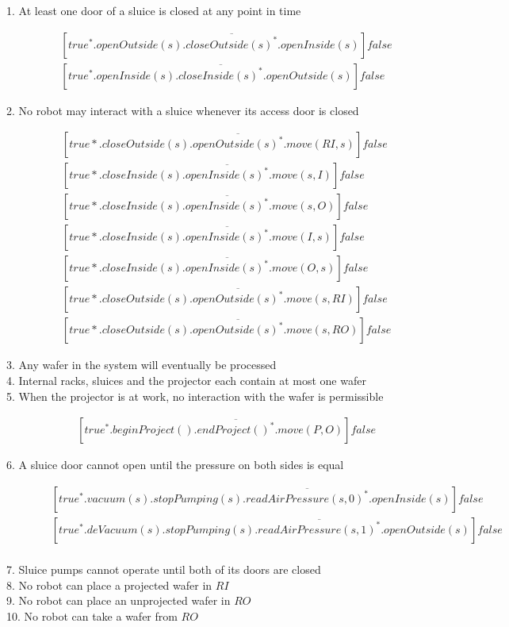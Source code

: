 
\begin{description}
 \item[1. At least one door of a sluice is closed at any point in time]
	\begin{align*}
		&[true^*.openOutside(s).\overline{closeOutside(s)^*}.openInside(s)]false \\
		&[true^*.openInside(s).\overline{closeInside(s)^*}.openOutside(s)]false
	\end{align*}

 \item[2. No robot may interact with a sluice whenever its access door is closed]
	\begin{align*}
		&[true*.closeOutside(s).\overline{openOutside(s)^*}.move(RI,s)]false \\
		&[true*.closeInside(s).\overline{openInside(s)^*}.move(s,I)]false \\
		&[true*.closeInside(s).\overline{openInside(s)^*}.move(s,O)]false \\
		&[true*.closeInside(s).\overline{openInside(s)^*}.move(I,s)]false \\
		&[true*.closeInside(s).\overline{openInside(s)^*}.move(O,s)]false \\
		&[true*.closeOutside(s).\overline{openOutside(s)^*}.move(s,RI)]false \\
		&[true*.closeOutside(s).\overline{openOutside(s)^*}.move(s,RO)]false
	\end{align*}
 
 \item[3. Any wafer in the system will eventually be processed]

 \item[4. Internal racks, sluices and the projector each contain at most one wafer]
 
 \item[5. When the projector is at work, no interaction with the wafer is permissible]
 	\begin{align*}
 		&[true^*.beginProject().\overline{endProject()^*}.move(P,O)]false
	\end{align*}
	
 \item[6. A sluice door cannot open until the pressure on both sides is equal]
	\begin{align*}
		&[true^*.vacuum(s).stopPumping(s).\overline{readAirPressure(s,0)^*}.openInside(s)]false \\
		&[true^*.deVacuum(s).stopPumping(s).\overline{readAirPressure(s,1)^*}.openOutside(s)]false \\
	\end{align*}
	
 \item[7. Sluice pumps cannot operate until both of its doors are closed]

 \item[8. No robot can place a projected wafer in $RI$]

 \item[9. No robot can place an unprojected wafer in $RO$]

 \item[10. No robot can take a wafer from $RO$]

\end{description}
